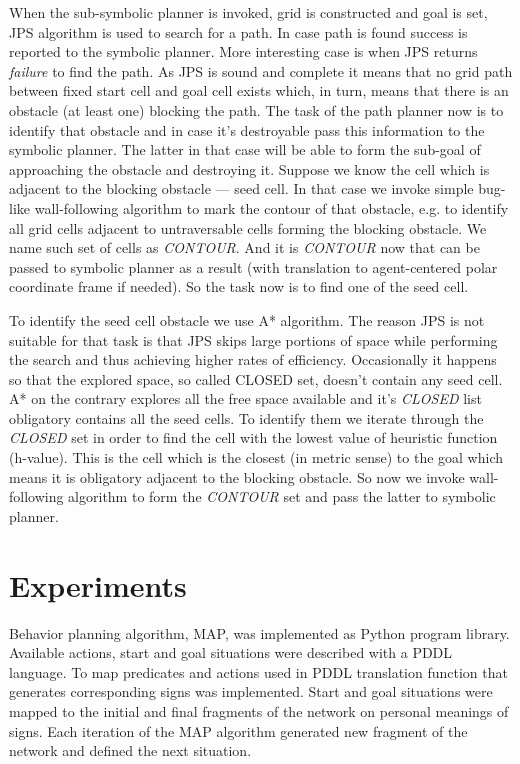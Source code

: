 \documentclass[procedia]{easychair}
\begin{document}
When the sub-symbolic planner is invoked, grid is constructed and goal is set, JPS algorithm is used to search for a path. In case path is found success is reported to the symbolic planner. More interesting case is when JPS returns \textit{failure} to find the path. As JPS is sound and complete it means that no grid path between fixed start cell and goal cell exists which, in turn, means that there is an obstacle (at least one) blocking the path. The task of the path planner now is to identify that obstacle and in case it's destroyable pass this information to the symbolic planner. The latter in that case will be able to form the sub-goal of approaching the obstacle and destroying it. Suppose we know the cell which is adjacent to the blocking obstacle --- seed cell. In that case we invoke simple bug-like wall-following algorithm to mark the contour of that obstacle, e.g. to identify all grid cells adjacent to untraversable cells forming the blocking obstacle. We name such set of cells as \textit{CONTOUR}. And it is \textit{CONTOUR} now that can be passed to symbolic planner as a result (with translation to agent-centered polar coordinate frame if needed). So the task now is to find one of the seed cell.

To identify the seed cell obstacle we use A* algorithm. The reason JPS is not suitable for that task is that JPS skips large portions of space while performing the search and thus achieving higher rates of efficiency. Occasionally it happens so that the explored space, so called CLOSED set, doesn't contain any seed cell. A* on the contrary explores all the free space available and it's \textit{CLOSED} list obligatory contains all the seed cells. To identify them we iterate through the \textit{CLOSED} set in order to find the cell with the lowest value of heuristic function (h-value). This is the cell which is the closest (in metric sense) to the goal which means it is obligatory adjacent to the blocking obstacle. So now we invoke wall-following algorithm to form the \textit{CONTOUR} set and pass the latter to symbolic planner.

\section{Experiments}
\label{sect:experiments}
Behavior planning algorithm, MAP, was implemented as Python program library. Available actions, start and goal situations were described with a PDDL language. To map predicates and actions used in PDDL translation function that generates corresponding signs was implemented. Start and goal situations were mapped to the initial and final fragments of the network on personal meanings of signs. Each iteration of the MAP algorithm generated new fragment of the network and defined the next situation.
\end{document}
